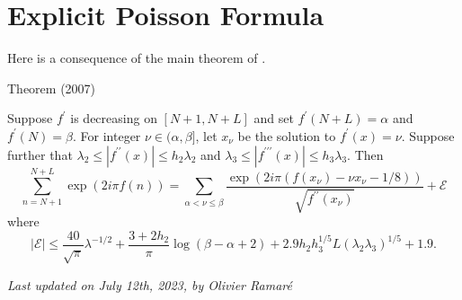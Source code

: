 \par 
\section{Explicit Poisson Formula}


Here is a consequence of the main theorem of
  \cite{Karatsuba-Korolev*07}
  .
\par 
\begin{thm}{Theorem (2007)}

    Suppose $f^\prime$ is decreasing on $[N+1,N+L]$ and set
    $f^\prime(N+L)=\alpha$ and $f^\prime(N) = \beta$.
    For integer $\nu\in(\alpha, \beta]$, let $x_\nu$ be the solution
    to $f^\prime(x)=\nu$. Suppose further that
$\lambda_2\le |f^{\prime\prime}(x)|\le h_2\lambda_2$ and
    $\lambda_3\le |f^{\prime\prime\prime}(x)|\le h_3\lambda_3$. Then
    $$
    \sum_{n=N+1}^{N+L} \exp(2i\pi f(n))
    =
    \sum_{\alpha < \nu\le \beta}
		   \frac{\exp(2i\pi (f(x_\nu)-\nu x_\nu-1/8))}{\sqrt{f^{\prime\prime}(x_\nu)}}
		   +\mathcal{E}
    $$
		   where
		   $$
		   |\mathcal{E}|
		   \le \frac{40}{\sqrt{\pi}}\lambda^{-1/2}
		   + \frac{3+2h_2}{\pi} \log(\beta-\alpha+2)
		   + 2.9 h_2h_3^{1/5}L(\lambda_2\lambda_3)^{1/5}
		   +1.9.
		   $$
		   
\end{thm}








  
\begin{flushright}\small\sl{}   Last updated on July 12th, 2023, by Olivier Ramar\'e
 \end{flushright}















